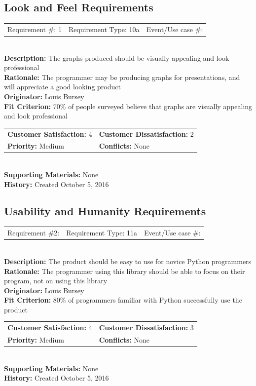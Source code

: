 \documentclass[12pt, titlepage]{article}
\begin{document}
\subsection{Look and Feel Requirements}
%
%
\begin{reqbox}
\begin{tabular}{ccc}
Requirement \#: 1& Requirement Type: 10a & Event/Use case \#: \\
\end{tabular} \\
\textbf{Description:} The graphs produced should be visually appealing and look professional \\
\textbf{Rationale:} The programmer may be producing graphs for presentations, and will appreciate a good looking product \\
\textbf{Originator:} Louis Bursey\\
\textbf{Fit Criterion:} 70\% of people surveyed believe that graphs are visually appealing and look professional  \\
\begin{tabular}{ll}
\textbf{Customer Satisfaction:} 4 & \textbf{Customer Dissatisfaction:} 2 \\
\textbf{Priority:} Medium & \textbf{Conflicts:} None\\
\end{tabular} \\
\textbf{Supporting Materials:} None \\
\textbf{History:} Created October 5, 2016
\end{reqbox}
%
%
\subsection{Usability and Humanity Requirements}

%
%
\begin{reqbox}
\begin{tabular}{ccc}
Requirement \#2: & Requirement Type: 11a & Event/Use case \#: \\
\end{tabular} \\
\textbf{Description:} The product should be easy to use for novice Python programmers \\
\textbf{Rationale:} The programmer using this library should be able to focus on their program, not on using this library \\
\textbf{Originator:} Louis Bursey\\
\textbf{Fit Criterion:} 80\% of programmers familiar with Python successfully use the product  \\
\begin{tabular}{ll}
\textbf{Customer Satisfaction:} 4 & \textbf{Customer Dissatisfaction:} 3 \\
\textbf{Priority:} Medium & \textbf{Conflicts:} None\\
\end{tabular} \\
\textbf{Supporting Materials:} None \\
\textbf{History:} Created October 5, 2016
\end{reqbox}
\end{document}
